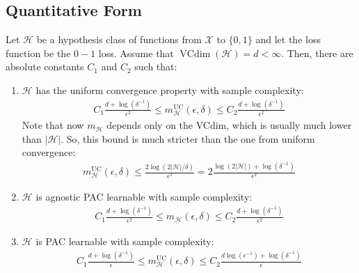 \documentclass[../template.tex]{subfiles}
\begin{document}
\subsection{Quantitative Form}
Let $\mathcal{H}$ be a hypothesis class of functions from $\mathcal{X}$ to $\{0,1\}$ and let the loss function be the $0-1$ loss. Assume that $\operatorname{VCdim}(\mathcal{H}) = d < \infty$. Then, there are absolute constants $C_1$ and $C_2$ such that:
\begin{enumerate}
    \item $\mathcal{H}$ has the uniform convergence property with sample complexity:
    \begin{align*}
        C_1 \frac{d + \log(\delta^{-1})}{\epsilon^2} \leq m_{\mathcal{H}}^{\mathrm{UC}} (\epsilon, \delta) \leq C_2 \frac{d + \log(\delta^{-1})}{\epsilon^2}  
    \end{align*} 
    Note that now $m_{\mathcal{H}}$ depends only on the VCdim, which is usually much lower than $|\mathcal{H}|$. So, this bound is much stricter than the one from uniform convergence:
    \begin{align*}
        m_{\mathcal{H}}^{\mathrm{UC}} (\epsilon, \delta) \leq \frac{2 \log(2 |\mathcal{H}|/\delta)}{\epsilon^2} = 2 \frac{\log(2 |\mathcal{H}|) + \log(\delta^{-1})}{\epsilon^2}  
    \end{align*}   
    \item $\mathcal{H}$ is agnostic PAC learnable with sample complexity:
    \begin{align*}
        C_1 \frac{d + \log(\delta^{-1})}{\epsilon^2} \leq m_{\mathcal{H}}(\epsilon, \delta) \leq C_2 \frac{d + \log(\delta^{-1})}{\epsilon^2}      
    \end{align*} 
    \item $\mathcal{H}$ is PAC learnable with sample complexity:
    \begin{align*}
        C_1 \frac{d + \log(\delta^{-1})}{\epsilon} \leq m_{\mathcal{H}}^{\mathrm{UC}} (\epsilon, \delta) \leq C_2 \frac{d \log (\epsilon^{-1}) + \log(\delta^{-1})}{\epsilon}  
    \end{align*} 
\end{enumerate}
\end{document}
